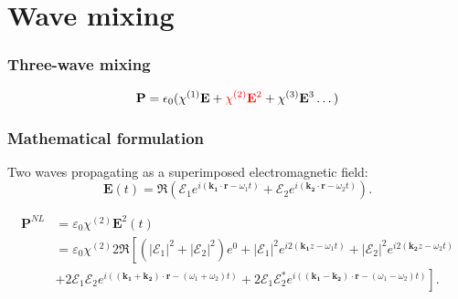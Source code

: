 \section{Wave mixing} 

\begin{frame}
\frametitle{Three-wave mixing}
\[
\mathbf P = \epsilon_0 ( \chi^{\textup{(1)}} \mathbf E +
\textcolor{red}{\chi^{\textup{(2)}} \mathbf E^2} + \chi^{\textup{(3)}} \mathbf E^3 \dots )
\]

\end{frame}

\begin{frame}
  \frametitle{Mathematical formulation}
Two waves propagating as a superimposed electromagnetic field: 
\[
     \mathbf{\mathbf{E}}(t) = \Re\left(\mathcal{E}_1e^{i(\mathbf{k_1} \cdot \mathbf{r} - \omega_1 t)}+\mathcal{E}_2e^{i(\mathbf{k_2} \cdot \mathbf{r} - \omega_2 t)} \right).
\]


\begin{align}
     \mathbf{P}^{NL} & = \varepsilon_0 \chi^{(2)} \mathbf{E}^2(t) \nonumber \\
&= \varepsilon_0 \chi^{(2)} 2 \Re \left[
\left(|\mathcal{E}_1|^2+|\mathcal{E}_2|^2\right)e^{0} + |\mathcal{E}_1|^2e^{i2(\mathbf{k_1} z - \omega_1t)}+|\mathcal{E}_2|^2e^{i2(\mathbf{k_2} z - \omega_2t)} \right.\nonumber \\
& \left.
+ 2\mathcal{E}_1 \mathcal{E}_2e^{i((\mathbf{k_1} + \mathbf{k_2}) \cdot \mathbf{r} - (\omega_1+\omega_2)t)} 
+ 2\mathcal{E}_1 \mathcal{E}_2^*e^{i((\mathbf{k_1} - \mathbf{k_2}) \cdot \mathbf{r} - (\omega_1-\omega_2)t)} 
\right] \label{eq:MixPNL}.
\end{align}

\end{frame}

